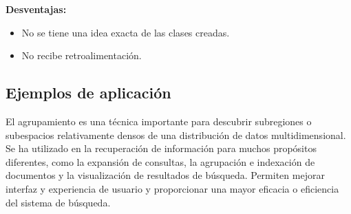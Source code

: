 \documentclass{llncs}
\begin{document}
\textbf{Desventajas:} 
	\begin{itemize}
		\item No se tiene una idea exacta de las clases creadas.
		\item No recibe retroalimentaci\'on.
	\end{itemize}

\subsection{Ejemplos de aplicaci\'on} 
El agrupamiento es una técnica importante para descubrir subregiones o subespacios relativamente densos de una distribución de datos multidimensional. Se ha utilizado en la recuperación de información para muchos propósitos diferentes, como la expansión de consultas, la agrupación e indexación de documentos y la visualización de resultados de búsqueda. Permiten mejorar interfaz y experiencia de usuario y proporcionar una mayor eficacia o eficiencia del sistema de búsqueda. 
\end{document}
